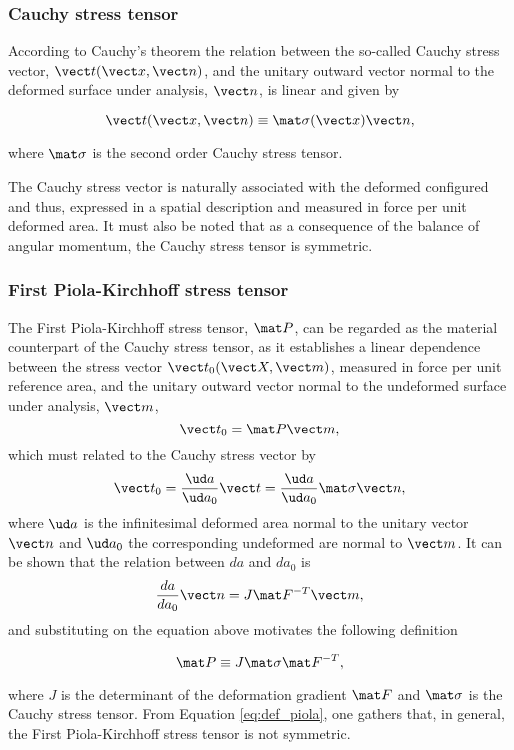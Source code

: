 \subsubsection{Cauchy stress tensor}

According to Cauchy's theorem the relation between the so-called Cauchy stress vector, $\vect t(\vect x,\vect n)$, and the unitary outward vector normal to the deformed surface under analysis, $\vect n$, is linear and given by
\begin{highlight}
    \begin{equation}
        \vect t(\vect x,\vect n)\equiv \mat \sigma(\vect x)\vect n,
    \end{equation}
\end{highlight}
where $\mat \sigma$ is the second order Cauchy stress tensor.

The Cauchy stress vector is naturally associated with the deformed configured and thus, expressed in a spatial description and measured in force per unit deformed area.
It must also be noted that as a consequence of the balance of angular momentum, the Cauchy stress tensor is symmetric.

\subsubsection{First Piola-Kirchhoff stress tensor}

    The First Piola-Kirchhoff stress tensor, $\mat P$, can be regarded as the material counterpart of the Cauchy stress tensor, as it establishes a linear dependence between the stress vector $\vect t_0(\vect X,\vect m)$, measured in force per unit reference area, and the unitary outward vector normal to the undeformed surface under analysis, $\vect m$,
    \begin{equation}
        \vect t_0 = \mat P \vect m,
    \end{equation}
    which must related to the Cauchy stress vector by
    \begin{equation}
        \vect t_0 =\frac{\ud a}{\ud a_0} \vect t = \frac{\ud a}{\ud a_0} \mat \sigma \vect n,
    \end{equation}
    where $\ud a$ is the infinitesimal deformed area normal to the unitary vector $\vect n$ and $\ud a_0$ the corresponding undeformed are normal to $\vect m$.
    It can be shown that the relation between $da$ and $da_0$ is
    \begin{equation}
        \frac{da}{da_0}\vect n=J\mat F^{-T}\vect m,
    \end{equation}
    and substituting on the equation above motivates the following definition
    \begin{highlight}
        \begin{equation}
            \mat P \equiv J\mat \sigma \mat F^{-T}, \label{eq:def_piola}
        \end{equation}
    \end{highlight}
     where $J$ is the determinant of the deformation gradient $\mat F$ and $\mat \sigma$ is the Cauchy stress tensor.
     From Equation \eqref{eq:def_piola}, one gathers that, in general, the First Piola-Kirchhoff stress tensor is not symmetric.



